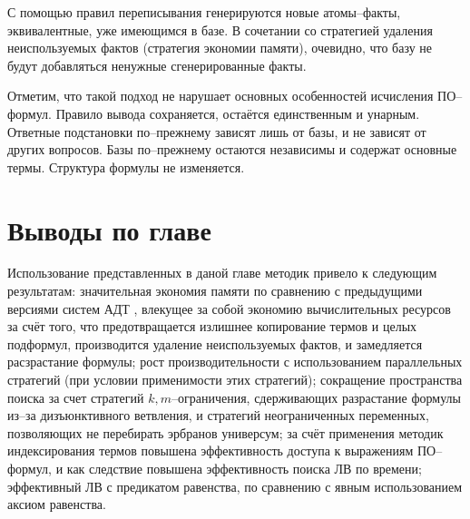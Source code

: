 С помощью правил переписывания генерируются новые атомы--факты, эквивалентные, уже имеющимся в базе. В сочетании со стратегией удаления неиспользуемых фактов (стратегия экономии памяти), очевидно, что базу не будут добавляться ненужные сгенерированные факты.

Отметим, что такой подход не нарушает основных особенностей исчисления ПО--формул. Правило вывода сохраняется, остаётся единственным и унарным. Ответные подстановки по--прежнему зависят лишь от базы, и не зависят от других вопросов. Базы по--прежнему остаются независимы и содержат основные термы. Структура формулы не изменяется.


\section{Выводы по главе}
Использование представленных в даной главе методик привело к следующим результатам: значительная экономия памяти по сравнению с предыдущими версиями систем АДТ \cite{dissChe}, влекущее за собой экономию вычислительных ресурсов за счёт того, что предотвращается излишнее копирование термов и целых подформул, производится удаление неиспользуемых фактов, и замедляется расзрастание формулы; рост производительности с использованием параллельных стратегий (при условии применимости этих стратегий); сокращение пространства поиска за счет стратегий $k,m$--ограничения, сдерживающих разрастание формулы из--за дизъюнктивного ветвления, и стратегий неограниченных переменных, позволяющих не перебирать эрбранов универсум; за счёт применения методик индексирования термов повышена эффективность доступа к выражениям ПО--формул, и как следствие повышена эффективность поиска ЛВ по времени; эффективный ЛВ с предикатом равенства, по сравнению с явным использованием аксиом равенства.










